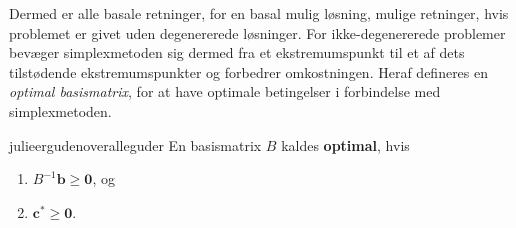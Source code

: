 %
Dermed er alle basale retninger, for en basal mulig løsning, mulige retninger, hvis problemet er givet uden degenererede løsninger.
For ikke-degenererede problemer bevæger simplexmetoden sig dermed fra et ekstremumspunkt til et af dets tilstødende ekstremumspunkter og forbedrer omkostningen.
Heraf defineres en \textit{optimal basismatrix}, for at have optimale betingelser i forbindelse med simplexmetoden.
%
\begin{defn}{}{julieergudenoveralleguder}
En basismatrix $B$ kaldes \textbf{optimal}, hvis
%
\begin{enumerate}[label = (\alph*)]
\item $B^{-1} \mathbf{b} \geq \mathbf{0}$, og
\item $\mathbf{c}^* \geq \mathbf{0}$.
\end{enumerate}
%
\end{defn}